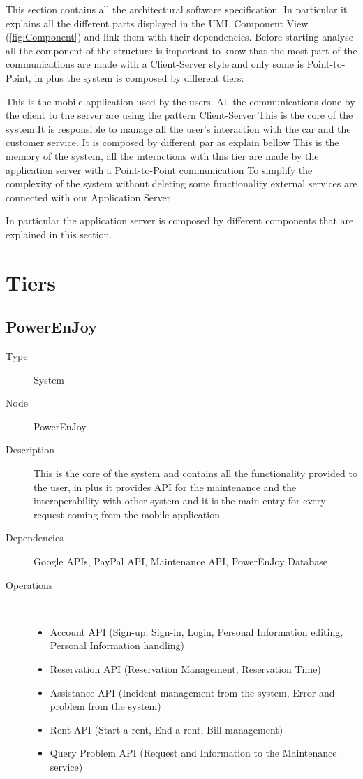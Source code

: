 This section contains all the architectural software specification. In particular it explains all the different parts displayed in the UML Component View (\ref{fig:Component}) and link them with their dependencies. Before starting analyse all the component of the structure is important to know that the most part of the communications are made with a Client-Server style and only some is Point-to-Point, in plus the system is composed by different tiers:
\begin{itemize}
	 This is the mobile application used by the users. All the communications done by the client to the server are using the pattern Client-Server
	 This is the core of the system.It is responsible to manage all the user's interaction with the car and the customer service. It is composed by different par as explain bellow
	 This is the memory of the system, all the interactions with this tier are made by the application server with a Point-to-Point communication
	 To simplify the complexity of the system without deleting some functionality external services are connected with our Application Server
\end{itemize}
In particular the application server is composed by different components that are explained in this section.

\section{Tiers}
\subsection{PowerEnJoy}
\begin{description}
	\item[Type] System
	\item[Node] PowerEnJoy
	\item[Description] This is the core of the system and contains all the functionality provided to the user, in plus it provides API for the maintenance and the interoperability with other system and it is the main entry for every request coming from the mobile application
	\item[Dependencies] Google APIs, PayPal API, Maintenance API, PowerEnJoy Database
	\item[Operations] \ \\
		\begin{itemize}
			\item Account API (Sign-up, Sign-in, Login, Personal Information editing, Personal Information handling)
			\item Reservation API (Reservation Management, Reservation Time)
			\item Assistance API (Incident management from the system, Error and problem from the system)
			\item Rent API (Start a rent, End a rent, Bill management)
			\item Query Problem API (Request and Information to the Maintenance service)
		\end{itemize}
\end{description}

